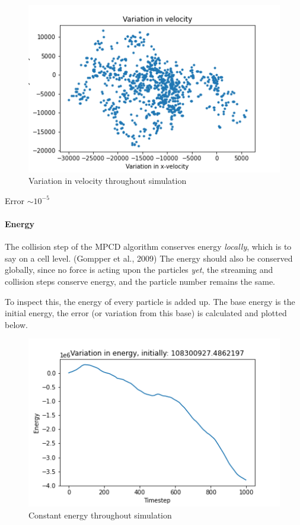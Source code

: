 \documentclass[
]{article}
\begin{document}
\begin{figure}
\centering
\includegraphics{Assets/velocity_variation.png}
\caption{Variation in velocity throughout simulation}
\end{figure}

Error \(\sim 10^{-5}\)

\hypertarget{energy}{%
\paragraph{Energy}\label{energy}}

The collision step of the MPCD algorithm conserves energy
\emph{locally}, which is to say on a cell level. (Gompper et al., 2009)
The energy should also be conserved globally, since no force is acting
upon the particles \emph{yet}, the streaming and collision steps
conserve energy, and the particle number remains the same.

To inspect this, the energy of every particle is added up. The base
energy is the initial energy, the error (or variation from this base) is
calculated and plotted below.

\begin{figure}
\centering
\includegraphics{Assets/constant_energy.png}
\caption{Constant energy throughout simulation}
\end{figure}
\end{document}
